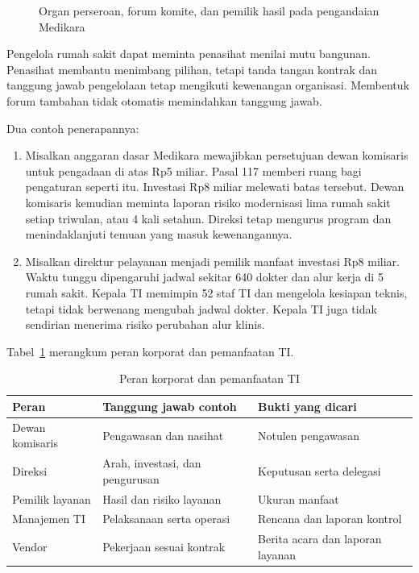 \begin{figure}[!htb]
  \centering
  
  \caption{Organ perseroan, forum komite, dan pemilik hasil pada pengandaian Medikara}
  \label{fig:ch02-organ-perseroan}
\end{figure}

Pengelola rumah sakit dapat meminta penasihat menilai mutu bangunan. Penasihat membantu
menimbang pilihan, tetapi tanda tangan kontrak dan tanggung jawab pengelolaan tetap
mengikuti kewenangan organisasi. Membentuk forum tambahan tidak otomatis memindahkan
tanggung jawab.

Dua contoh penerapannya:
\begin{enumerate}
  \item Misalkan anggaran dasar Medikara mewajibkan persetujuan dewan komisaris untuk
  pengadaan di atas Rp5 miliar. Pasal 117 memberi ruang bagi pengaturan seperti itu.
  Investasi Rp8 miliar melewati batas tersebut. Dewan komisaris kemudian meminta laporan
  risiko modernisasi lima rumah sakit setiap triwulan, atau 4 kali setahun. Direksi tetap
  mengurus program dan menindaklanjuti temuan yang masuk kewenangannya.
  \item Misalkan direktur pelayanan menjadi pemilik manfaat investasi Rp8 miliar. Waktu
  tunggu dipengaruhi jadwal sekitar 640 dokter dan alur kerja di 5 rumah sakit. Kepala TI
  memimpin 52 staf TI dan mengelola kesiapan teknis, tetapi tidak berwenang mengubah jadwal
  dokter. Kepala TI juga tidak sendirian menerima risiko perubahan alur klinis.
\end{enumerate}

Tabel~\ref{tab:ch02-korporat} merangkum peran korporat dan pemanfaatan TI.
\begin{table}[!htb]
  \centering\small
  \caption{Peran korporat dan pemanfaatan TI}\label{tab:ch02-korporat}
  \begin{tabularx}{\textwidth}{|>{\raggedright\arraybackslash}p{}|>{\raggedright\arraybackslash}X|>{\raggedright\arraybackslash}X|}
    \hline
    \textbf{Peran} & \textbf{Tanggung jawab contoh} & \textbf{Bukti yang dicari} \\ \hline
    Dewan komisaris & Pengawasan dan nasihat & Notulen pengawasan \\ \hline
    Direksi & Arah, investasi, dan pengurusan & Keputusan serta delegasi \\ \hline
    Pemilik layanan & Hasil dan risiko layanan & Ukuran manfaat \\ \hline
    Manajemen TI & Pelaksanaan serta operasi & Rencana dan laporan kontrol \\ \hline
    Vendor & Pekerjaan sesuai kontrak & Berita acara dan laporan layanan \\ \hline
  \end{tabularx}
\end{table}

